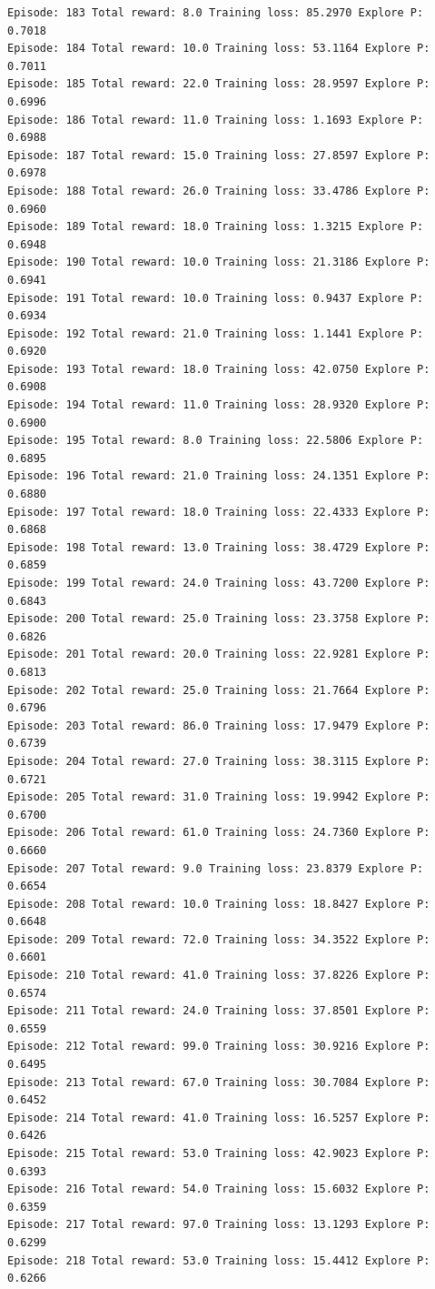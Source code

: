 \documentclass[11pt]{article}
\begin{document}
\begin{Verbatim}[commandchars=\\\{\}]
Episode: 183 Total reward: 8.0 Training loss: 85.2970 Explore P: 0.7018
Episode: 184 Total reward: 10.0 Training loss: 53.1164 Explore P: 0.7011
Episode: 185 Total reward: 22.0 Training loss: 28.9597 Explore P: 0.6996
Episode: 186 Total reward: 11.0 Training loss: 1.1693 Explore P: 0.6988
Episode: 187 Total reward: 15.0 Training loss: 27.8597 Explore P: 0.6978
Episode: 188 Total reward: 26.0 Training loss: 33.4786 Explore P: 0.6960
Episode: 189 Total reward: 18.0 Training loss: 1.3215 Explore P: 0.6948
Episode: 190 Total reward: 10.0 Training loss: 21.3186 Explore P: 0.6941
Episode: 191 Total reward: 10.0 Training loss: 0.9437 Explore P: 0.6934
Episode: 192 Total reward: 21.0 Training loss: 1.1441 Explore P: 0.6920
Episode: 193 Total reward: 18.0 Training loss: 42.0750 Explore P: 0.6908
Episode: 194 Total reward: 11.0 Training loss: 28.9320 Explore P: 0.6900
Episode: 195 Total reward: 8.0 Training loss: 22.5806 Explore P: 0.6895
Episode: 196 Total reward: 21.0 Training loss: 24.1351 Explore P: 0.6880
Episode: 197 Total reward: 18.0 Training loss: 22.4333 Explore P: 0.6868
Episode: 198 Total reward: 13.0 Training loss: 38.4729 Explore P: 0.6859
Episode: 199 Total reward: 24.0 Training loss: 43.7200 Explore P: 0.6843
Episode: 200 Total reward: 25.0 Training loss: 23.3758 Explore P: 0.6826
Episode: 201 Total reward: 20.0 Training loss: 22.9281 Explore P: 0.6813
Episode: 202 Total reward: 25.0 Training loss: 21.7664 Explore P: 0.6796
Episode: 203 Total reward: 86.0 Training loss: 17.9479 Explore P: 0.6739
Episode: 204 Total reward: 27.0 Training loss: 38.3115 Explore P: 0.6721
Episode: 205 Total reward: 31.0 Training loss: 19.9942 Explore P: 0.6700
Episode: 206 Total reward: 61.0 Training loss: 24.7360 Explore P: 0.6660
Episode: 207 Total reward: 9.0 Training loss: 23.8379 Explore P: 0.6654
Episode: 208 Total reward: 10.0 Training loss: 18.8427 Explore P: 0.6648
Episode: 209 Total reward: 72.0 Training loss: 34.3522 Explore P: 0.6601
Episode: 210 Total reward: 41.0 Training loss: 37.8226 Explore P: 0.6574
Episode: 211 Total reward: 24.0 Training loss: 37.8501 Explore P: 0.6559
Episode: 212 Total reward: 99.0 Training loss: 30.9216 Explore P: 0.6495
Episode: 213 Total reward: 67.0 Training loss: 30.7084 Explore P: 0.6452
Episode: 214 Total reward: 41.0 Training loss: 16.5257 Explore P: 0.6426
Episode: 215 Total reward: 53.0 Training loss: 42.9023 Explore P: 0.6393
Episode: 216 Total reward: 54.0 Training loss: 15.6032 Explore P: 0.6359
Episode: 217 Total reward: 97.0 Training loss: 13.1293 Explore P: 0.6299
Episode: 218 Total reward: 53.0 Training loss: 15.4412 Explore P: 0.6266

\end{Verbatim}
\end{document}
